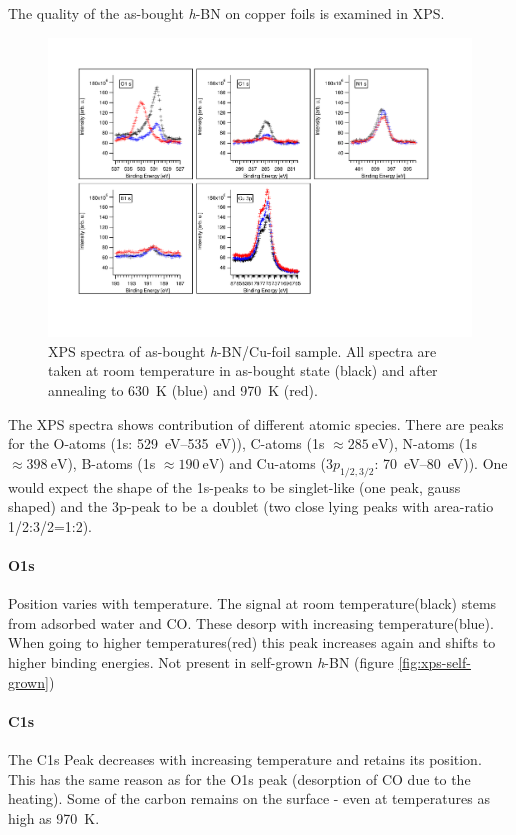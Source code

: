 The quality of the as-bought \textit{h}-BN on copper foils\cite{_graphene_2014} is examined in XPS.
\begin{figure}
\includegraphics[angle=90,width=1.2\textwidth]{./images/XPS-spectra-as-bought.pdf}
\caption{XPS spectra of as-bought \textit{h}-BN/Cu-foil sample\cite{_graphene_2014}. All spectra are taken at room temperature in as-bought state (black) and after annealing to  \SI{630}{\K} (blue) and  \SI{970}{\K} (red).}
\end{figure}
The XPS spectra shows contribution of different atomic species. There are peaks for the O-atoms (1s: \SIrange{529}{535}{\eV})), C-atoms (1s $\approx \SI{285}{\eV}$), N-atoms (1s $\approx \SI{398}{\eV}$), B-atoms (1s $\approx \SI{190}{\eV}$) and Cu-atoms ($3p_{1/2,3/2}$: \SIrange{70}{80}{\eV})). One would expect the shape of the 1s-peaks to be singlet-like (one peak, gauss shaped) and the 3p-peak to be a doublet (two close lying peaks with area-ratio 1/2:3/2=1:2).

\paragraph{O1s}
Position varies with temperature. The signal at room temperature(black) stems from adsorbed water and CO. These desorp with increasing temperature(blue). When going to higher temperatures(red) this peak increases again and shifts to higher binding energies. Not present in self-grown \textit{h}-BN (figure \ref{fig:xps-self-grown})

\paragraph{C1s}
The C1s Peak decreases with increasing temperature and retains its position. This has the same  reason as for the O1s peak (desorption of CO due to the heating). Some of the carbon remains on the surface - even at temperatures as high as \SI{970}{\K}.

